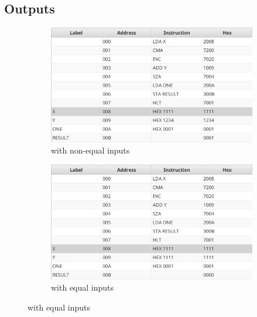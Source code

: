 \documentclass[11pt]{article}
\begin{document}
\subsection*{Outputs}
\begin{figure}[H]
\begin{subfigure}{.5\textwidth}
  \centering
  \includegraphics[width=\linewidth]{out-neq.png}
  \caption*{with non-equal inputs}
\end{subfigure}
\begin{subfigure}{.5\textwidth}
  \centering
  \includegraphics[width=\linewidth]{out-eq.png}
  \caption*{with equal inputs}
\end{subfigure}
\end{figure}
\end{document}
